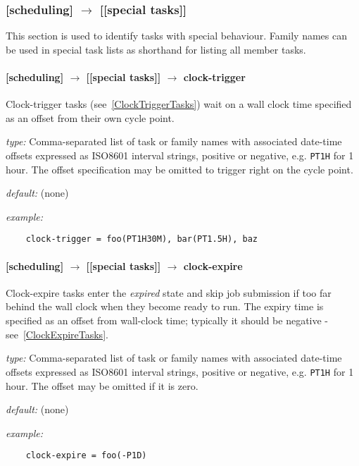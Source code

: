 \subsubsection[{[[}special tasks{]]}]{[scheduling] $\rightarrow$ [[special tasks]]}

This section is used to identify tasks with special behaviour. Family names can
be used in special task lists as shorthand for listing all member tasks.

\paragraph[clock-trigger]{[scheduling] $\rightarrow$ [[special tasks]] $\rightarrow$ clock-trigger}

Clock-trigger tasks (see~\ref{ClockTriggerTasks}) wait on a wall clock time
specified as an offset from their own cycle point.

\begin{myitemize}
    \item {\em type:} Comma-separated list of task or family names with
        associated date-time offsets expressed as ISO8601 interval strings,
        positive or negative, e.g. \lstinline=PT1H= for 1 hour.  The offset
        specification may be omitted to trigger right on the cycle point.
    \item {\em default:} (none)
    \item {\em example:}
\begin{lstlisting}
    clock-trigger = foo(PT1H30M), bar(PT1.5H), baz
\end{lstlisting}
\end{myitemize}

\paragraph[clock-expire]{[scheduling] $\rightarrow$ [[special tasks]] $\rightarrow$ clock-expire}
\label{ClockExpireRef}

Clock-expire tasks enter the {\em expired} state and skip job submission if too
far behind the wall clock when they become ready to run.  The expiry time is
specified as an offset from wall-clock time; typically it should be negative -
see~\ref{ClockExpireTasks}. 

\begin{myitemize}
    \item {\em type:} Comma-separated list of task or family names with
        associated date-time offsets expressed as ISO8601 interval strings,
        positive or negative, e.g. \lstinline=PT1H= for 1 hour.  The offset
        may be omitted if it is zero.
    \item {\em default:} (none)
    \item {\em example:}
\begin{lstlisting}
    clock-expire = foo(-P1D)
\end{lstlisting}
\end{myitemize}

